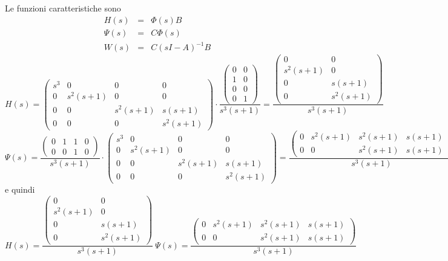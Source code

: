 \documentclass{article}
\begin{document}
Le funzioni caratteristiche sono \[\begin{array}{rcl}  H(s) & = & \Phi(s)B \\ \Psi(s) & = & C \Phi(s)\\ W(s) & = & C(sI-A)^{-1}B  \end{array} \]
\[ H(s) = \left(\begin{matrix}s^{3} & 0 & 0 & 0\\0 & s^{2} \left(s + 1\right) & 0 & 0\\0 & 0 & s^{2} \left(s + 1\right) & s \left(s + 1\right)\\0 & 0 & 0 & s^{2} \left(s + 1\right)\end{matrix}\right)\cdot \frac{\left(\begin{matrix}0 & 0\\1 & 0\\0 & 0\\0 & 1\end{matrix}\right)}{s^{3} \left(s + 1\right)} = \frac{\left(\begin{matrix}0 & 0\\s^{2} \left(s + 1\right) & 0\\0 & s \left(s + 1\right)\\0 & s^{2} \left(s + 1\right)\end{matrix}\right)}{s^{3} \left(s + 1\right)} \]\[ \Psi(s) = \frac{\left(\begin{matrix}0 & 1 & 1 & 0\\0 & 0 & 1 & 0\end{matrix}\right)}{s^{3} \left(s + 1\right)}\cdot\left(\begin{matrix}s^{3} & 0 & 0 & 0\\0 & s^{2} \left(s + 1\right) & 0 & 0\\0 & 0 & s^{2} \left(s + 1\right) & s \left(s + 1\right)\\0 & 0 & 0 & s^{2} \left(s + 1\right)\end{matrix}\right)  = \frac{\left(\begin{matrix}0 & s^{2} \left(s + 1\right) & s^{2} \left(s + 1\right) & s \left(s + 1\right)\\0 & 0 & s^{2} \left(s + 1\right) & s \left(s + 1\right)\end{matrix}\right)}{s^{3} \left(s + 1\right)} \]
e quindi \[ H(s)  =  \frac{\left(\begin{matrix}0 & 0\\s^{2} \left(s + 1\right) & 0\\0 & s \left(s + 1\right)\\0 & s^{2} \left(s + 1\right)\end{matrix}\right)}{s^{3} \left(s + 1\right)} \ \Psi(s) = \frac{\left(\begin{matrix}0 & s^{2} \left(s + 1\right) & s^{2} \left(s + 1\right) & s \left(s + 1\right)\\0 & 0 & s^{2} \left(s + 1\right) & s \left(s + 1\right)\end{matrix}\right)}{s^{3} \left(s + 1\right)} \]
\end{document}
